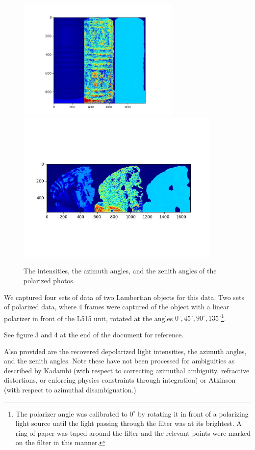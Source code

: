 \documentclass[final]{cvpr}
\begin{document}
\begin{figure}
	\begin{center}
		\includegraphics[width=8cm]{sfp_roller_parametrization.jpeg}
		\includegraphics[width=10cm]{sfp_conch_parameterization}
		\caption{The intensities, the azimuth angles, and the zenith angles of the polarized photos.} 
	\end{center}	
\end{figure}

We captured four sets of data of two Lambertian objects for this data. Two sets of polarized data, where 4 frames were captured of the object with a linear polarizer in front of the L515 unit, rotated at the angles $0^{\circ}, 45^{\circ}, 90^{\circ}, 135^{\circ}$\footnote{The polarizer angle was calibrated to $0^{\circ}$ by rotating it in front of a polarizing light source until the light passing through the filter was at its brightest. A ring of paper was taped around the filter and the relevant points were marked on the filter in this manner.}.  

See figure 3 and 4 at the end of the document for reference. 

Also provided are the recovered depolarized light intensities, the azimuth angles, and the zenith angles. Note these have not been processed for ambiguities as described by Kadambi \cite{Kadambi2017} (with respect to correcting azimuthal ambiguity, refractive distortions, or enforcing physics constraints through integration)  or Atkinson \cite{atkinson} (with respect to azimuthal disambiguation.) 
\end{document}
